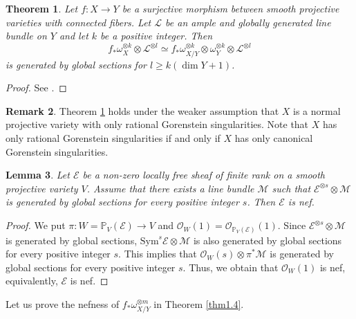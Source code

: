 \documentclass[12pt,twoside]{amsart}
\newtheorem{thm}{Theorem}[section]
\newtheorem{lem}[thm]{Lemma}
\theoremstyle{definition}
\newtheorem{rem}[thm]{Remark}
\begin{document}
\begin{thm}\label{thm5.1} 
Let $f:X\to Y$ be a surjective morphism between smooth projective 
varieties with connected fibers. 
Let $\mathcal L$ be an ample and globally generated 
line bundle on $Y$ and let $k$ be a positive integer. 
Then $$
f_*\omega^{\otimes k} _X\otimes \mathcal L^{\otimes l}\simeq 
f_*\omega^{\otimes k}_{X/Y}\otimes \omega^{\otimes k}_Y\otimes 
\mathcal L^{\otimes l}
$$ 
is generated by global sections for $l\geq k(\dim Y+1)$. 
\end{thm}
\begin{proof}
See \cite[Section 2]{popa-schnell}. 
\end{proof}

\begin{rem}\label{rem5.2}
Theorem \ref{thm5.1} holds under the weaker assumption that 
$X$ is a normal projective variety with only rational Gorenstein singularities. 
Note that $X$ has only rational Gorenstein singularities 
if and only if $X$ has only canonical Gorenstein singularities. 
\end{rem}

\begin{lem}\label{lem5.3}
Let $\mathcal E$ be 
a non-zero locally free sheaf of finite rank on a smooth 
projective variety $V$. 
Assume that 
there exists a line bundle $\mathcal M$ 
such that $\mathcal E^{\otimes s}\otimes \mathcal M$ 
is 
generated by global sections for every positive integer $s$. 
Then $\mathcal E$ is nef. 
\end{lem}

\begin{proof}
We put $\pi:W=\mathbb P_V(\mathcal E)\to V$ and 
$\mathcal O_W(1)=\mathcal O_{\mathbb P_V(\mathcal E)}(1)$. 
Since $\mathcal E^{\otimes s}\otimes \mathcal M$ is generated by 
global sections, 
$\mathrm{Sym}^s\mathcal E\otimes \mathcal M$ is 
also generated by global sections for every positive integer $s$. 
This implies that $\mathcal O_W(s)\otimes \pi^*\mathcal M$ is 
generated by global sections for every positive integer $s$. 
Thus, we obtain that $\mathcal O_W(1)$ is nef, equivalently, 
$\mathcal E$ is nef. 
\end{proof}

Let us prove the nefness of $f_*\omega^{\otimes m}_{X/Y}$ in 
Theorem \ref{thm1.4}. 
\end{document}
